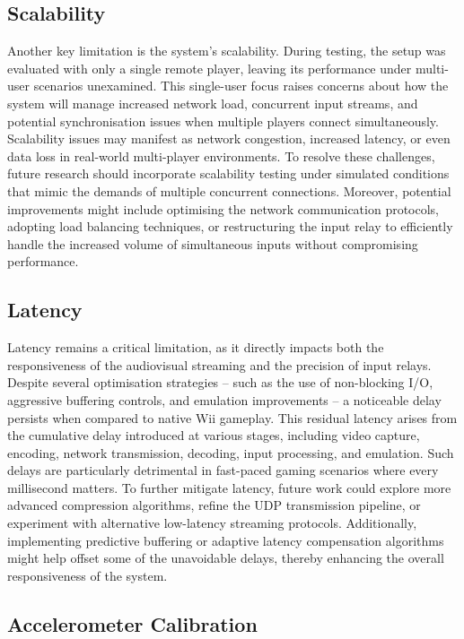 \subsection{Scalability}

Another key limitation is the system’s scalability. During testing, the setup
was evaluated with only a single remote player, leaving its performance under
multi-user scenarios unexamined. This single-user focus raises concerns about
how the system will manage increased network load, concurrent input streams, and
potential synchronisation issues when multiple players connect simultaneously.
Scalability issues may manifest as network congestion, increased latency, or
even data loss in real-world multi-player environments. To resolve these
challenges, future research should incorporate scalability testing under
simulated conditions that mimic the demands of multiple concurrent connections.
Moreover, potential improvements might include optimising the network
communication protocols, adopting load balancing techniques, or restructuring
the input relay to efficiently handle the increased volume of simultaneous
inputs without compromising performance.

\subsection{Latency}

Latency remains a critical limitation, as it directly impacts both the
responsiveness of the audiovisual streaming and the precision of input relays.
Despite several optimisation strategies -- such as the use of non-blocking I/O,
aggressive buffering controls, and emulation improvements -- a noticeable delay
persists when compared to native Wii gameplay. This residual latency arises from
the cumulative delay introduced at various stages, including video capture,
encoding, network transmission, decoding, input processing, and emulation. Such
delays are particularly detrimental in fast-paced gaming scenarios where every
millisecond matters. To further mitigate latency, future work could explore more
advanced compression algorithms, refine the UDP transmission pipeline, or
experiment with alternative low-latency streaming protocols. Additionally,
implementing predictive buffering or adaptive latency compensation algorithms
might help offset some of the unavoidable delays, thereby enhancing the overall
responsiveness of the system.

\subsection{Accelerometer Calibration}

